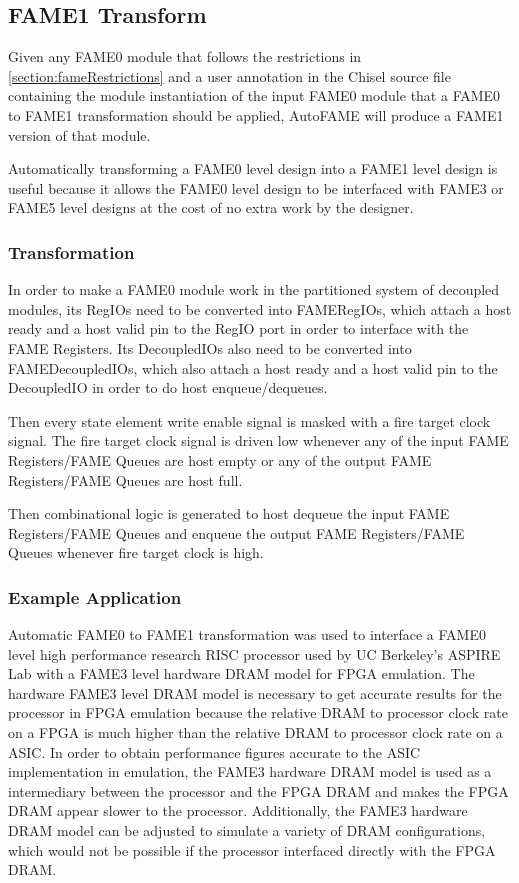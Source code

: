 \subsection{FAME1 Transform}
Given any FAME0 module that follows the restrictions in \ref{section:fameRestrictions} and a user annotation in the Chisel source file containing the module instantiation of the input FAME0 module that a FAME0 to FAME1 transformation should be applied, AutoFAME will produce a FAME1 version of that module.

Automatically transforming a FAME0 level design into a FAME1 level design is useful because it allows the FAME0 level design to be interfaced with FAME3 or FAME5 level designs at the cost of no extra work by the designer.

\subsubsection{Transformation}
In order to make a FAME0 module work in the partitioned system of decoupled modules, its RegIOs need to be converted into FAMERegIOs, which attach a host ready and a host valid pin to the RegIO port in order to interface with the FAME Registers. Its DecoupledIOs also need to be converted into FAMEDecoupledIOs, which also attach a host ready and a host valid pin to the DecoupledIO in order to do host enqueue/dequeues.

Then every state element write enable signal is masked with a fire target clock signal. The fire target clock signal is driven low whenever any of the input FAME Registers/FAME Queues are host empty or any of the output FAME Registers/FAME Queues are host full.

Then combinational logic is generated to host dequeue the input FAME Registers/FAME Queues and enqueue the output FAME Registers/FAME Queues whenever fire target clock is high.

\subsubsection{Example Application}
Automatic FAME0 to FAME1 transformation was used to interface a FAME0 level high performance research RISC processor used by UC Berkeley's ASPIRE Lab with a FAME3 level hardware DRAM model for FPGA emulation. The hardware FAME3 level DRAM model is necessary to get accurate results for the processor in FPGA emulation because the relative DRAM to processor clock rate on a FPGA is much higher than the relative DRAM to processor clock rate on a ASIC. In order to obtain performance figures accurate to the ASIC implementation in emulation, the FAME3 hardware DRAM model is used as a intermediary between the processor and the FPGA DRAM and makes the FPGA DRAM appear slower to the processor. Additionally, the FAME3 hardware DRAM model can be adjusted to simulate a variety of DRAM configurations, which would not be possible if the processor interfaced directly with the FPGA DRAM.

